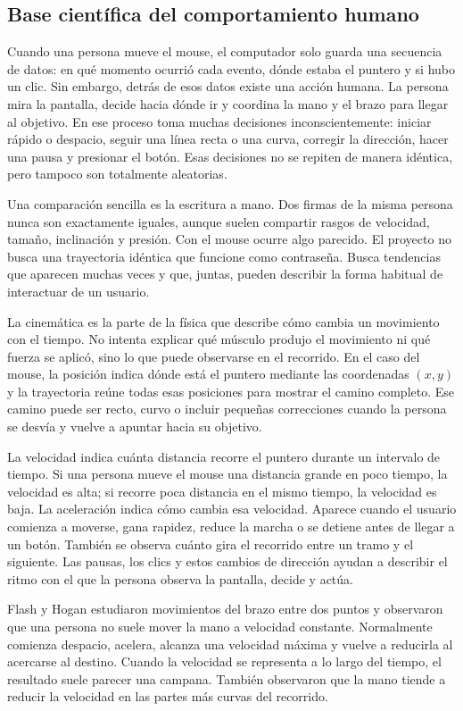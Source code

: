 \documentclass[11pt,letterpaper]{article}
\begin{document}
\subsection{Base científica del comportamiento humano}

Cuando una persona mueve el mouse, el computador solo guarda una secuencia de datos: en qué momento ocurrió cada
evento, dónde estaba el puntero y si hubo un clic. Sin embargo, detrás de esos datos existe una acción humana. La
persona mira la pantalla, decide hacia dónde ir y coordina la mano y el brazo para llegar al objetivo. En ese
proceso toma muchas decisiones inconscientemente: iniciar rápido o despacio, seguir una línea recta o una curva,
corregir la dirección, hacer una pausa y presionar el botón. Esas decisiones no se repiten de manera idéntica,
pero tampoco son totalmente aleatorias.

Una comparación sencilla es la escritura a mano. Dos firmas de la misma persona nunca son exactamente iguales,
aunque suelen compartir rasgos de velocidad, tamaño, inclinación y presión. Con el mouse ocurre algo parecido. El
proyecto no busca una trayectoria idéntica que funcione como contraseña. Busca tendencias que aparecen muchas veces
y que, juntas,
pueden describir la forma habitual de interactuar de un usuario.

La cinemática es la parte de la física que describe cómo cambia un movimiento con el tiempo. No intenta explicar qué
músculo produjo el movimiento ni qué fuerza se aplicó, sino lo que puede observarse en el recorrido. En el caso del
mouse, la posición indica dónde está el puntero mediante las coordenadas $(x,y)$ y la trayectoria reúne todas esas
posiciones para mostrar el camino completo. Ese camino puede ser recto, curvo o incluir pequeñas correcciones cuando
la persona se desvía y vuelve a apuntar hacia su objetivo.

La velocidad indica cuánta distancia recorre el puntero durante un intervalo de tiempo. Si una persona mueve el mouse
una distancia grande en poco tiempo, la velocidad es alta; si recorre poca distancia en el mismo tiempo, la velocidad
es baja. La aceleración indica cómo cambia esa velocidad. Aparece cuando el usuario comienza a moverse, gana rapidez,
reduce la marcha o se detiene antes de llegar a un botón. También se observa cuánto gira el recorrido entre un tramo
y el siguiente. Las pausas, los clics y estos cambios de dirección ayudan a describir el ritmo con el que la persona
observa la pantalla, decide y actúa.

Flash y Hogan \cite{flash1985} estudiaron movimientos del brazo entre dos puntos y observaron que una persona no suele
mover la mano a velocidad constante. Normalmente comienza despacio, acelera, alcanza una velocidad máxima y vuelve a
reducirla al acercarse al destino. Cuando la velocidad se representa a lo largo del tiempo, el resultado suele parecer
una campana. También observaron que la mano tiende a reducir la velocidad en las partes más curvas del recorrido.
\end{document}
